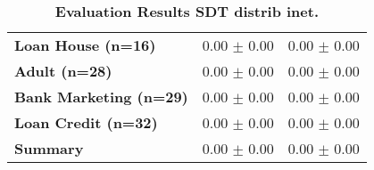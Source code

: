 \begin{table}[htb]
{\begin{tabular}{lll}
\textbf{Loan House (n=16)                        } &  \phantom{0}0.00 $\pm$ \phantom{0}0.00 &             \phantom{0}0.00 $\pm$ \phantom{0}0.00 \\
\textbf{Adult (n=28)                             } &  \phantom{0}0.00 $\pm$ \phantom{0}0.00 &             \phantom{0}0.00 $\pm$ \phantom{0}0.00 \\
\textbf{Bank Marketing (n=29)                    } &  \phantom{0}0.00 $\pm$ \phantom{0}0.00 &             \phantom{0}0.00 $\pm$ \phantom{0}0.00 \\
\textbf{Loan Credit (n=32)                       } &  \phantom{0}0.00 $\pm$ \phantom{0}0.00 &             \phantom{0}0.00 $\pm$ \phantom{0}0.00 \\
\midrule
\textbf{Summary                                  } &  \phantom{0}0.00 $\pm$ \phantom{0}0.00 &             \phantom{0}0.00 $\pm$ \phantom{0}0.00 \\
\bottomrule
\end{tabular}%
}
\caption{\textbf{Evaluation Results SDT distrib inet.}}
\label{tab:eval-results}
\end{table}
\newpage 


